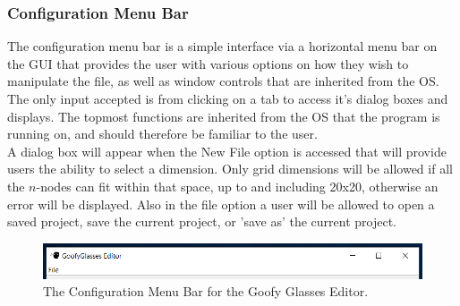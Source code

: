 \documentclass[12pt]{article}
\begin{document}
	\subsubsection {Configuration Menu Bar}
  	The configuration menu bar is a simple interface via a horizontal menu bar on the GUI that provides the user with various options on how they wish to manipulate the file, as well as window controls that are inherited from the OS. 
    \\
    The only input accepted is from clicking on a tab to access it's dialog boxes and displays. The topmost functions are inherited from the OS that the program is running on, and should therefore be familiar to the user. 
    \\
    A dialog box will appear when the New File option is accessed that will provide users the ability to select a dimension. Only grid dimensions will be allowed if all the $n$-nodes can fit within that space, up to and including 20x20, otherwise an error will be displayed. Also in the file option a user will be allowed to open a saved project, save the current project, or 'save as' the current project. \\
     
  	\begin{figure}[h]
  		\centering
  		\includegraphics[width=\linewidth]{configuration_menu_bar.png}
  		\caption{The Configuration Menu Bar for the Goofy Glasses Editor.}
  	\end{figure}
	
  
\end{document}

